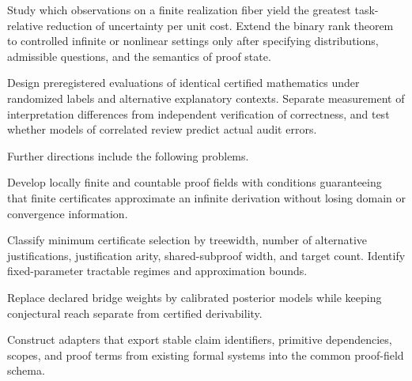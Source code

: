 \begin{PPTproblem}
\label{PPT:res:28:2}
Study which observations on a finite realization fiber yield the greatest task-relative reduction of uncertainty per unit cost. Extend the binary rank theorem to controlled infinite or nonlinear settings only after specifying distributions, admissible questions, and the semantics of proof state.
\end{PPTproblem}

\begin{PPTproblem}
\label{PPT:res:28:3}
Design preregistered evaluations of identical certified mathematics under randomized labels and alternative explanatory contexts. Separate measurement of interpretation differences from independent verification of correctness, and test whether models of correlated review predict actual audit errors.
\end{PPTproblem}



Further directions include the following problems.

\begin{PPTproblem}
\label{PPT:res:28:4}
Develop locally finite and countable proof fields with conditions guaranteeing that finite certificates approximate an infinite derivation without losing domain or convergence information.
\end{PPTproblem}

\begin{PPTproblem}
\label{PPT:res:28:5}
Classify minimum certificate selection by treewidth, number of alternative justifications, justification arity, shared-subproof width, and target count. Identify fixed-parameter tractable regimes and approximation bounds.
\end{PPTproblem}

\begin{PPTproblem}
\label{PPT:res:28:6}
Replace declared bridge weights by calibrated posterior models while keeping conjectural reach separate from certified derivability.
\end{PPTproblem}

\begin{PPTproblem}
\label{PPT:res:28:7}
Construct adapters that export stable claim identifiers, primitive dependencies, scopes, and proof terms from existing formal systems into the common proof-field schema.
\end{PPTproblem}

